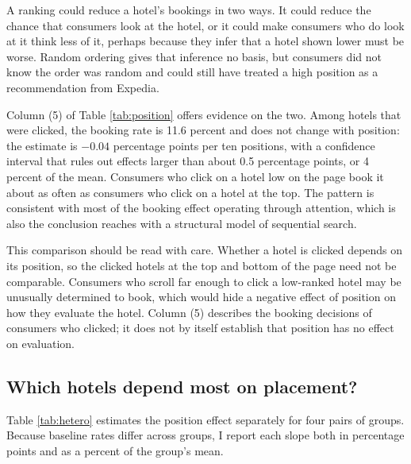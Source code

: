 \documentclass[12pt]{article}
\begin{document}
A ranking could reduce a hotel's bookings in two ways. It could reduce the chance that consumers look at the hotel, or it could make consumers who do look at it think less of it, perhaps because they infer that a hotel shown lower must be worse. Random ordering gives that inference no basis, but consumers did not know the order was random and could still have treated a high position as a recommendation from Expedia.

Column (5) of Table \ref{tab:position} offers evidence on the two. Among hotels that were clicked, the booking rate is 11.6 percent and does not change with position: the estimate is $-0.04$ percentage points per ten positions, with a confidence interval that rules out effects larger than about 0.5 percentage points, or 4 percent of the mean. Consumers who click on a hotel low on the page book it about as often as consumers who click on a hotel at the top. The pattern is consistent with most of the booking effect operating through attention, which is also the conclusion \citet{ursu2018power} reaches with a structural model of sequential search.

This comparison should be read with care. Whether a hotel is clicked depends on its position, so the clicked hotels at the top and bottom of the page need not be comparable. Consumers who scroll far enough to click a low-ranked hotel may be unusually determined to book, which would hide a negative effect of position on how they evaluate the hotel. Column (5) describes the booking decisions of consumers who clicked; it does not by itself establish that position has no effect on evaluation.

\subsection{Which hotels depend most on placement?}

Table \ref{tab:hetero} estimates the position effect separately for four pairs of groups. Because baseline rates differ across groups, I report each slope both in percentage points and as a percent of the group's mean.
\end{document}
